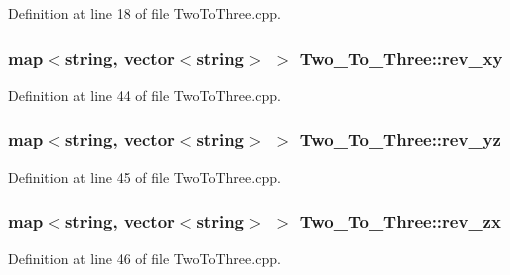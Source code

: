 Definition at line 18 of file Two\+To\+Three.\+cpp.

\subsubsection[{\texorpdfstring{rev\+\_\+xy}{rev_xy}}]{\setlength{\rightskip}{0pt plus 5cm}map$<$string, vector$<$string$>$ $>$ Two\+\_\+\+To\+\_\+\+Three\+::rev\+\_\+xy}\hypertarget{class_two___to___three_a485336245fad21fd41d8552df9fe9dd1}{}\label{class_two___to___three_a485336245fad21fd41d8552df9fe9dd1}


Definition at line 44 of file Two\+To\+Three.\+cpp.

\subsubsection[{\texorpdfstring{rev\+\_\+yz}{rev_yz}}]{\setlength{\rightskip}{0pt plus 5cm}map$<$string, vector$<$string$>$ $>$ Two\+\_\+\+To\+\_\+\+Three\+::rev\+\_\+yz}\hypertarget{class_two___to___three_afb85013e1ee6676f359de1f5c9e0a5da}{}\label{class_two___to___three_afb85013e1ee6676f359de1f5c9e0a5da}


Definition at line 45 of file Two\+To\+Three.\+cpp.

\subsubsection[{\texorpdfstring{rev\+\_\+zx}{rev_zx}}]{\setlength{\rightskip}{0pt plus 5cm}map$<$string, vector$<$string$>$ $>$ Two\+\_\+\+To\+\_\+\+Three\+::rev\+\_\+zx}\hypertarget{class_two___to___three_a11ca3157f2afc24a1d896bd8a8232156}{}\label{class_two___to___three_a11ca3157f2afc24a1d896bd8a8232156}


Definition at line 46 of file Two\+To\+Three.\+cpp.

